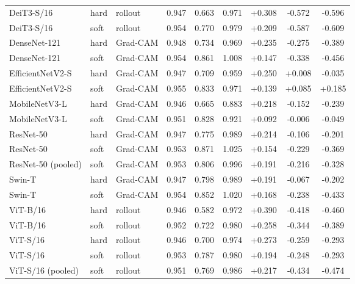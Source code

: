 \begin{table}[!htbp]
{\begin{tabular}{lllcccccc}
DeiT3-S/16 & hard & rollout & 0.947 & 0.663 & 0.971 & +0.308 & -0.572 & -0.596 \\
DeiT3-S/16 & soft & rollout & 0.954 & 0.770 & 0.979 & +0.209 & -0.587 & -0.609 \\
DenseNet-121 & hard & Grad-CAM & 0.948 & 0.734 & 0.969 & +0.235 & -0.275 & -0.389 \\
DenseNet-121 & soft & Grad-CAM & 0.954 & 0.861 & 1.008 & +0.147 & -0.338 & -0.456 \\
EfficientNetV2-S & hard & Grad-CAM & 0.947 & 0.709 & 0.959 & +0.250 & +0.008 & -0.035 \\
EfficientNetV2-S & soft & Grad-CAM & 0.955 & 0.833 & 0.971 & +0.139 & +0.085 & +0.185 \\
MobileNetV3-L & hard & Grad-CAM & 0.946 & 0.665 & 0.883 & +0.218 & -0.152 & -0.239 \\
MobileNetV3-L & soft & Grad-CAM & 0.951 & 0.828 & 0.921 & +0.092 & -0.006 & -0.049 \\
ResNet-50 & hard & Grad-CAM & 0.947 & 0.775 & 0.989 & +0.214 & -0.106 & -0.201 \\
ResNet-50 & soft & Grad-CAM & 0.953 & 0.871 & 1.025 & +0.154 & -0.229 & -0.369 \\
ResNet-50 (pooled) & soft & Grad-CAM & 0.953 & 0.806 & 0.996 & +0.191 & -0.216 & -0.328 \\
Swin-T & hard & Grad-CAM & 0.947 & 0.798 & 0.989 & +0.191 & -0.067 & -0.202 \\
Swin-T & soft & Grad-CAM & 0.954 & 0.852 & 1.020 & +0.168 & -0.238 & -0.433 \\
ViT-B/16 & hard & rollout & 0.946 & 0.582 & 0.972 & +0.390 & -0.418 & -0.460 \\
ViT-B/16 & soft & rollout & 0.952 & 0.722 & 0.980 & +0.258 & -0.344 & -0.389 \\
ViT-S/16 & hard & rollout & 0.946 & 0.700 & 0.974 & +0.273 & -0.259 & -0.293 \\
ViT-S/16 & soft & rollout & 0.953 & 0.787 & 0.980 & +0.194 & -0.248 & -0.293 \\
ViT-S/16 (pooled) & soft & rollout & 0.951 & 0.769 & 0.986 & +0.217 & -0.434 & -0.474 \\
\bottomrule
\end{tabular}}
\end{table}
